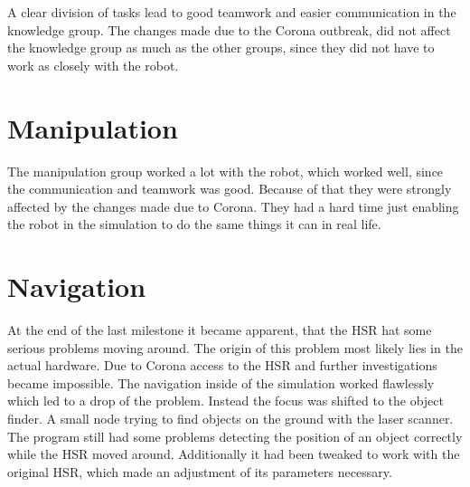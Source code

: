 \documentclass[main.tex]{subfiles}
\begin{document}
A clear division of tasks lead to good teamwork and easier communication in the knowledge group.
The changes made due to the Corona outbreak, did not affect the knowledge group as much as the other groups, since they did not have to work as closely with the robot.

\section{Manipulation}

The manipulation group worked a lot with the robot, which worked well, since the communication and teamwork was good.
Because of that they were strongly affected by the changes made due to Corona. They had a hard time just enabling the robot in the simulation to do the same things it can in real life.

\section{Navigation}
At the end of the last milestone it became apparent, that the HSR hat some serious problems moving around. The origin of this problem most likely lies in the actual hardware. Due to Corona access to the HSR and further investigations became impossible. The navigation inside of the simulation worked flawlessly which led to a drop of the problem. Instead the focus was shifted to the object finder. A small node trying to find objects on the ground with the laser scanner. The program still had some problems detecting the position of an object correctly while the HSR moved around. Additionally it had been tweaked to work with the original HSR, which made an adjustment of its parameters necessary.  
\end{document}
